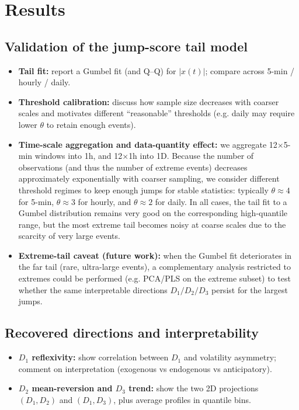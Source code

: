 \documentclass[11pt]{article}
\begin{document}
\section{Results}

\subsection*{Validation of the jump-score tail model}
\begin{itemize}
    \item \textbf{Tail fit:} report a Gumbel fit (and Q--Q) for $|x(t)|$; compare across 5-min / hourly / daily. 
    \item \textbf{Threshold calibration:} discuss how sample size decreases with coarser scales and motivates different ``reasonable'' thresholds (e.g. daily may require lower $\theta$ to retain enough events). 
    \item \textbf{Time-scale aggregation and data-quantity effect:} we aggregate 12$\times$5-min windows into 1h, and 12$\times$1h into 1D. Because the number of observations (and thus the number of extreme events) decreases approximately exponentially with coarser sampling, we consider different threshold regimes to keep enough jumps for stable statistics: typically $\theta\approx4$ for 5-min, $\theta\approx3$ for hourly, and $\theta\approx2$ for daily. In all cases, the tail fit to a Gumbel distribution remains very good on the corresponding high-quantile range, but the most extreme tail becomes noisy at coarse scales due to the scarcity of very large events.
    \item \textbf{Extreme-tail caveat (future work):} when the Gumbel fit deteriorates in the far tail (rare, ultra-large events), a complementary analysis restricted to extremes could be performed (e.g. PCA/PLS on the extreme subset) to test whether the same interpretable directions $D_1/D_2/D_3$ persist for the largest jumps. 
\end{itemize}

\subsection*{Recovered directions and interpretability}
\begin{itemize}
    \item \textbf{$D_1$ reflexivity:} show correlation between $D_1$ and volatility asymmetry; comment on interpretation (exogenous vs endogenous vs anticipatory). 
    \item \textbf{$D_2$ mean-reversion and $D_3$ trend:} show the two 2D projections $(D_1,D_2)$ and $(D_1,D_3)$, plus average profiles in quantile bins. 
\end{itemize}
\end{document}
